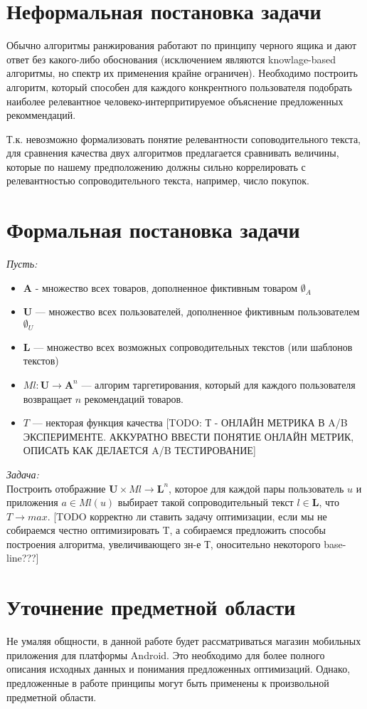 \documentclass[12pt,a4paper]{report}
\begin{document}
\section{Неформальная постановка задачи}
Обычно алгоритмы ранжирования работают по принципу черного ящика и дают ответ без какого-либо обоснования (исключением являются knowlage-based алгоритмы, но спектр их применения крайне ограничен). Необходимо построить алгоритм, который способен для каждого конкрентного пользователя подобрать  наиболее релевантное человеко-интерпритируемое объяснение предложенных рекоммендаций.

 Т.к. невозможно формализовать понятие релевантности соповодительного текста, для сравнения качества двух алгоритмов предлагается сравнивать величины, которые по нашему предположению должны сильно коррелировать с релевантностью сопроводительного текста, например, число покупок.
\section{Формальная постановка задачи}
\textit{Пусть:}
\begin{itemize}
\item  $\textbf{A}$ - множество всех товаров, дополненное фиктивным товаром $\emptyset_A$
\item $\textbf{U}$ --- множество всех пользователей, дополненное фиктивным пользователем $\emptyset_U$
\item $\textbf{L}$ --- множество всех возможных сопроводительных текстов (или шаблонов текстов)
\item $Ml: \textbf{U} \to \textbf{A}^n$ --- алгорим таргетирования, который для каждого пользователя возвращает $n$ рекомендаций товаров.
\item $T$ --- некторая функция качества [TODO: Т - ОНЛАЙН МЕТРИКА В A/B ЭКСПЕРИМЕНТЕ. АККУРАТНО ВВЕСТИ ПОНЯТИЕ ОНЛАЙН МЕТРИК, ОПИСАТЬ КАК ДЕЛАЕТСЯ A/B ТЕСТИРОВАНИЕ]
\end{itemize}
\textit{Задача:}
\\Построить отображние $\textbf{U} \times Ml \to \textbf{L}^n$, которое для каждой пары пользователь $u$ и приложения $a \in Ml(u)$ выбирает такой сопроводительный текст $l \in \textbf{L}$, что $T \to max$.
[TODO корректно ли ставить задачу оптимизации, если мы не собираемся честно оптимизировать T, а собираемся предложить способы построения алгоритма, увеличивающего зн-е Т, оносительно некоторого base-line???]

\section{Уточнение предметной области}
Не умаляя общности, в данной работе будет рассматриваться магазин мобильных приложения для платформы Android. Это необходимо для более полного описания исходных данных и понимания предложенных оптимизаций. Однако, предложенные в работе принципы могут быть применены к произвольной предметной области.
\end{document}
